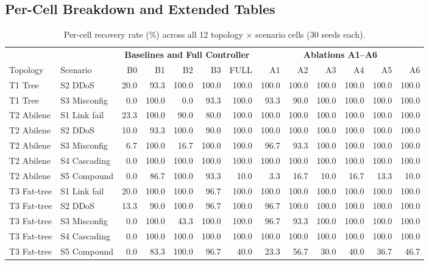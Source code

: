 \documentclass[sn-mathphys,Numbered]{sn-jnl}
\begin{document}
\FloatBarrier
\begin{appendices}
\section{Per-Cell Breakdown and Extended Tables}\label{secA1}

\begin{table}[h]\centering\scriptsize\setlength{\tabcolsep}{3pt}
\caption{Per-cell recovery rate (\%) across all 12 topology $\times$ scenario cells (30 seeds each).}\label{tab:percell_rec}%
\begin{adjustbox}{max width=\textwidth,center}
\begin{tabular}{llrrrrr@{\hspace{12pt}}rrrrrr}
\toprule
& & \multicolumn{5}{c}{\textbf{Baselines and Full Controller}} & \multicolumn{6}{c}{\textbf{Ablations A1--A6}} \\
\cmidrule(lr){3-7}\cmidrule(lr){8-13}
Topology & Scenario & B0 & B1 & B2 & B3 & FULL & A1 & A2 & A3 & A4 & A5 & A6 \\
\midrule
T1 Tree & S2 DDoS & 20.0 & 93.3 & 100.0 & 100.0 & 100.0 & 100.0 & 100.0 & 100.0 & 100.0 & 100.0 & 100.0 \\
T1 Tree & S3 Misconfig & 0.0 & 100.0 & 0.0 & 93.3 & 100.0 & 93.3 & 90.0 & 100.0 & 100.0 & 100.0 & 100.0 \\
\midrule
T2 Abilene & S1 Link fail & 23.3 & 100.0 & 90.0 & 80.0 & 100.0 & 100.0 & 100.0 & 100.0 & 100.0 & 100.0 & 100.0 \\
T2 Abilene & S2 DDoS & 10.0 & 93.3 & 100.0 & 90.0 & 100.0 & 100.0 & 100.0 & 100.0 & 100.0 & 100.0 & 100.0 \\
T2 Abilene & S3 Misconfig & 6.7 & 100.0 & 16.7 & 100.0 & 100.0 & 96.7 & 93.3 & 100.0 & 100.0 & 100.0 & 100.0 \\
T2 Abilene & S4 Cascading & 0.0 & 100.0 & 100.0 & 100.0 & 100.0 & 100.0 & 100.0 & 100.0 & 100.0 & 100.0 & 100.0 \\
T2 Abilene & S5 Compound & 0.0 & 86.7 & 100.0 & 93.3 & 10.0 & 3.3 & 16.7 & 10.0 & 16.7 & 13.3 & 10.0 \\
\midrule
T3 Fat-tree & S1 Link fail & 20.0 & 100.0 & 100.0 & 96.7 & 100.0 & 100.0 & 100.0 & 100.0 & 100.0 & 100.0 & 100.0 \\
T3 Fat-tree & S2 DDoS & 13.3 & 90.0 & 100.0 & 96.7 & 100.0 & 96.7 & 100.0 & 100.0 & 100.0 & 100.0 & 100.0 \\
T3 Fat-tree & S3 Misconfig & 0.0 & 100.0 & 43.3 & 100.0 & 100.0 & 96.7 & 93.3 & 100.0 & 100.0 & 100.0 & 100.0 \\
T3 Fat-tree & S4 Cascading & 0.0 & 100.0 & 100.0 & 100.0 & 100.0 & 100.0 & 100.0 & 100.0 & 100.0 & 100.0 & 100.0 \\
T3 Fat-tree & S5 Compound & 0.0 & 83.3 & 100.0 & 96.7 & 40.0 & 23.3 & 56.7 & 30.0 & 40.0 & 36.7 & 46.7 \\
\bottomrule
\end{tabular}
\end{adjustbox}
\end{table}


\end{appendices}
\end{document}
